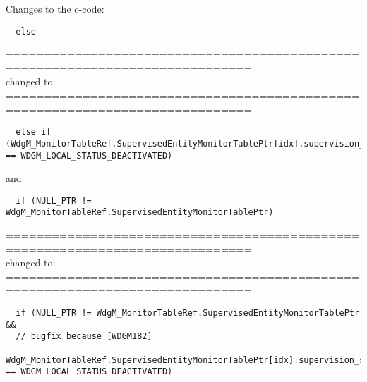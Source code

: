 \documentclass[11pt,a4paper]{article}
\begin{document}

Changes to the c-code:
\begin{lstlisting}
  else
\end{lstlisting}
==============================================================================\\
changed to:\\
==============================================================================
\begin{lstlisting}
  else if (WdgM_MonitorTableRef.SupervisedEntityMonitorTablePtr[idx].supervision_status == WDGM_LOCAL_STATUS_DEACTIVATED)
\end{lstlisting}
and
\begin{lstlisting}
  if (NULL_PTR != WdgM_MonitorTableRef.SupervisedEntityMonitorTablePtr)
\end{lstlisting}
==============================================================================\\
changed to:\\
==============================================================================
\begin{lstlisting}
  if (NULL_PTR != WdgM_MonitorTableRef.SupervisedEntityMonitorTablePtr &&
  // bugfix because [WDGM182]
  WdgM_MonitorTableRef.SupervisedEntityMonitorTablePtr[idx].supervision_status == WDGM_LOCAL_STATUS_DEACTIVATED)
\end{lstlisting}

\newpage
\end{document}
